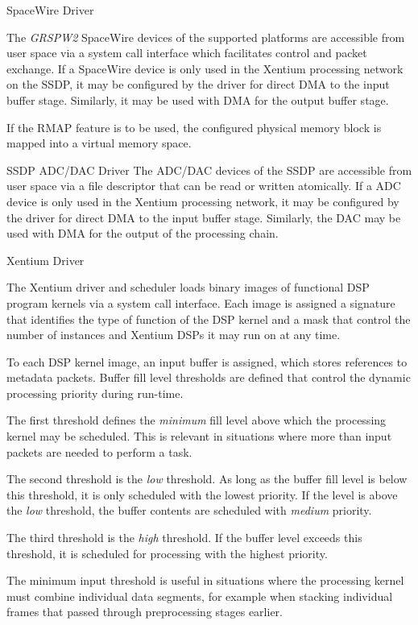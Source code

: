 %
{\gls{SpaceWire} Driver}{%
The \emph{GRSPW2} \gls{SpaceWire} devices of the supported platforms are
accessible from user space via a system call interface which facilitates control
and packet exchange. 
If a \gls{SpaceWire} device is only used in the \gls{Xentium}
processing network on the \gls{SSDP}, it may be configured by the driver for direct \gls{DMA} to
the input buffer stage. Similarly, it may be used with \gls{DMA} for the output
buffer stage.

If the \gls{RMAP} feature is to be used, the configured physical memory block
is mapped into a virtual memory space.
}%
{}{}


%
{\gls{SSDP} \gls{ADC}/\gls{DAC} Driver}{%
The \gls{ADC}/\gls{DAC} devices of the \gls{SSDP} are accessible from user
space via a file descriptor that can be read or written atomically.
If a \gls{ADC} device is only used in the \gls{Xentium} processing
network, it may be configured by the driver for direct \gls{DMA} to the input
buffer stage. Similarly, the \gls{DAC} may be used with \gls{DMA} for the
output of the processing chain.
}%
{}{}


%
{Xentium Driver}{%
The \gls{Xentium} driver and scheduler loads binary images of functional
\gls{DSP} program kernels via a system call interface. Each image is assigned a
signature that identifies the type of function of the \gls{DSP} kernel and a
mask that control the number of instances and \gls{Xentium} \glspl{DSP} it
may run on at any time. \newline

To each \gls{DSP} kernel image, an input buffer is assigned, which stores
references to metadata packets. Buffer fill level thresholds are defined that
control the dynamic processing priority during run-time. \newline

The first threshold defines the \emph{minimum} fill level above which the
processing kernel may be scheduled. This is relevant in situations where more
than input packets are needed to perform a task. \newline

The second threshold is the \emph{low} threshold.
As long as the buffer fill level is below this threshold, it is only scheduled
with the lowest priority. If the level is above the \emph{low} threshold, the
buffer contents are scheduled with \emph{medium} priority. \newline

The third threshold is the \emph{high} threshold. If the buffer level exceeds
this threshold, it is scheduled for processing with the highest priority.
}%
{}{%
The minimum input threshold is useful in situations where the processing kernel
must combine individual data segments, for example when stacking individual
frames that passed through preprocessing stages earlier.
}


